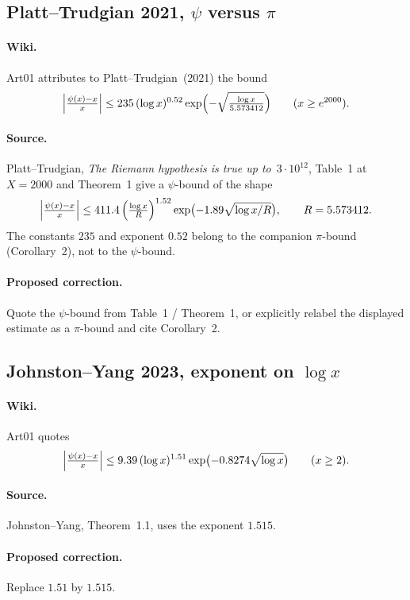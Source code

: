 \documentclass[11pt,a4paper]{article}
\begin{document}
\subsection{Platt--Trudgian 2021, $\psi$ versus $\pi$}
\label{err:pt2021-psi}
\paragraph{Wiki.}
Art01 attributes to Platt--Trudgian~(2021) the bound
\[
\Bigl|\tfrac{\psi(x)-x}{x}\Bigr|
\le 235\,(\log x)^{0.52}\exp\Bigl(-\sqrt{\tfrac{\log x}{5.573412}}\Bigr)
\qquad(x\ge e^{2000}).
\]
\paragraph{Source.}
Platt--Trudgian, \emph{The Riemann hypothesis is true up to}~$3\cdot 10^{12}$,
Table~1 at $X=2000$ and Theorem~1 give a $\psi$-bound of the shape
\[
\Bigl|\tfrac{\psi(x)-x}{x}\Bigr|
\le 411.4\,\Bigl(\tfrac{\log x}{R}\Bigr)^{1.52}
\exp\bigl(-1.89\sqrt{\log x/R}\bigr),\qquad R=5.573412.
\]
The constants $235$ and exponent $0.52$ belong to the companion $\pi$-bound
(Corollary~2), not to the $\psi$-bound.
\paragraph{Proposed correction.}
Quote the $\psi$-bound from Table~1 / Theorem~1, or explicitly relabel the
displayed estimate as a $\pi$-bound and cite Corollary~2.

\subsection{Johnston--Yang 2023, exponent on $\log x$}
\label{err:jy-1515}
\paragraph{Wiki.}
Art01 quotes
\[
\Bigl|\tfrac{\psi(x)-x}{x}\Bigr|
\le 9.39\,(\log x)^{1.51}\exp\bigl(-0.8274\sqrt{\log x}\bigr)
\qquad(x\ge 2).
\]
\paragraph{Source.}
Johnston--Yang, Theorem~1.1, uses the exponent $\mathbf{1.515}$.
\paragraph{Proposed correction.}
Replace $1.51$ by $1.515$.
\end{document}

